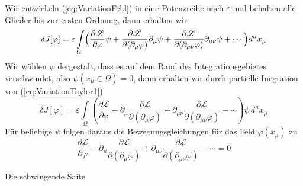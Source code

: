 Wir entwickeln (\ref{eq:VariationFeld}) in eine Potenzreihe nach $\varepsilon$
und behalten alle Glieder bis zur ersten Ordnung, dann erhalten wir
\begin{equation}\label{eq:VariationTaylor1}
  \delta J[\varphi]=\varepsilon\int\limits_{\Omega}\Bigl(
    \frac{\partial\mathcal{L}}{\partial\varphi}\psi
    +\frac{\partial\mathcal{L}}{\partial(\partial_{\mu}\varphi)}\partial_{\mu}\psi
  +\frac{\partial\mathcal{L}}{\partial(\partial_{\mu\nu}\varphi)}\partial_{\mu\nu}\psi+\cdots\Bigr)d^n x_\mu
\end{equation}
Wir wählen $\psi$ dergestalt, dass es auf dem Rand des Integrationsgebietes
verschwindet, also $\psi(x_{\mu}\in\Omega)=0$, dann erhalten wir durch
partielle Inegration von (\ref{eq:VariationTaylor1})
\begin{equation}\label{eq:VariationFunktionalFeld}
 \delta J[\varphi]=\varepsilon\int\limits_{\Omega}\left(
    \frac{\partial\mathcal{L}}{\partial\varphi}
    -\partial_{\mu}\frac{\partial\mathcal{L}}{\partial(\partial_{\mu}\varphi)}
    +\partial_{\mu\nu}\frac{\partial\mathcal{L}}{\partial(\partial_{\mu\nu}\varphi)}
  -\cdots\right)\psi\, d^n x_\mu
\end{equation}
Für beliebige $\psi$ folgen daraus die Bewegungsgleichungen für das Feld $\varphi(x_\mu)$ zu
\begin{equation}
  \frac{\partial\mathcal{L}}{\partial\varphi}
    -\partial_{\mu}\frac{\partial\mathcal{L}}{\partial(\partial_{\mu}\varphi)}
    +\partial_{\mu\nu}\frac{\partial\mathcal{L}}{\partial(\partial_{\mu\nu}\varphi)}
  -\cdots=0
  \label{eq:EulerLagrangeFeld}
\end{equation}
\begin{example}{Die schwingende Saite}

\end{example}